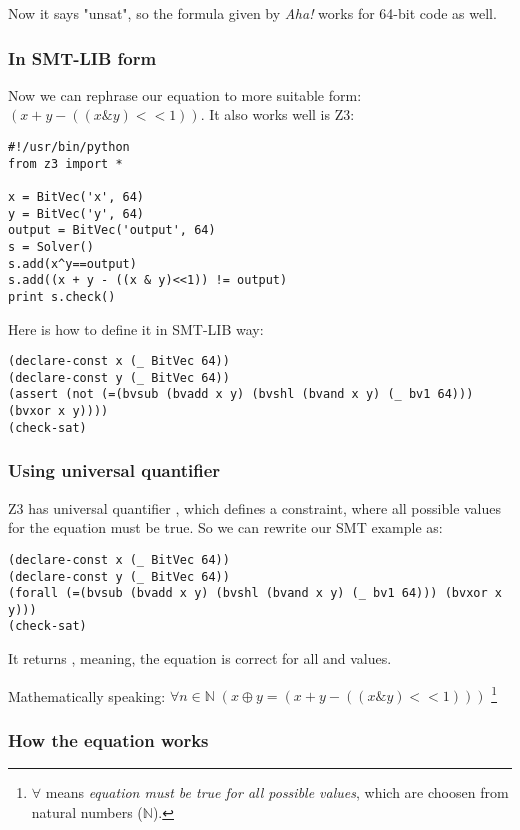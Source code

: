 Now it says "unsat", so the formula given by \textit{Aha!} works for 64-bit code as well.

\subsubsection{In SMT-LIB form}

Now we can rephrase our equation to more suitable form: $(x + y - ((x \& y)<<1))$.
It also works well is Z3:

\begin{lstlisting}
#!/usr/bin/python
from z3 import *

x = BitVec('x', 64)
y = BitVec('y', 64)
output = BitVec('output', 64)
s = Solver()
s.add(x^y==output)
s.add((x + y - ((x & y)<<1)) != output)
print s.check()
\end{lstlisting}

Here is how to define it in SMT-LIB way:

\begin{lstlisting}
(declare-const x (_ BitVec 64))
(declare-const y (_ BitVec 64))
(assert (not (=(bvsub (bvadd x y) (bvshl (bvand x y) (_ bv1 64))) (bvxor x y))))
(check-sat)
\end{lstlisting}

\subsubsection{Using universal quantifier}

Z3 has universal quantifier , which defines a constraint, where all possible values for the equation must be true.
So we can rewrite our SMT example as:

\begin{lstlisting}
(declare-const x (_ BitVec 64))
(declare-const y (_ BitVec 64))
(forall (=(bvsub (bvadd x y) (bvshl (bvand x y) (_ bv1 64))) (bvxor x y)))
(check-sat)
\end{lstlisting}

It returns , meaning, the equation is correct for all  and  values.

Mathematically speaking: $\forall n\!\in\!\mathbb{N}\; (x \oplus y = (x + y - ((x \& y)<<1)))$
\footnote{
$\forall$ means \textit{equation must be true for all possible values}, which are choosen from natural numbers ($\mathbb{N}$).}

\subsubsection{How the equation works}

